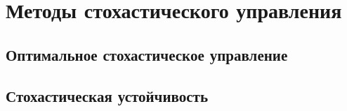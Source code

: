 \chapter{Методы стохастического управления}


\section{Оптимальное стохастическое управление}



\section{Стохастическая устойчивость}
